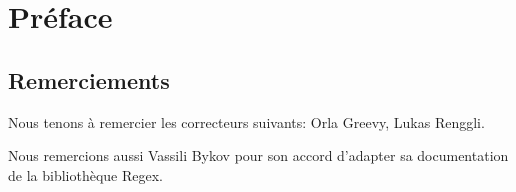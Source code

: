 \documentclass[a4paper,10pt,twoside]{book}
\begin{document}
	\sloppy
	\frontmatter
\fi
\chapter{Préface}



\section*{Remerciements}






Nous tenons à remercier les correcteurs suivants: 
Orla Greevy,
Lukas Renggli.

Nous remercions aussi 
Vassili Bykov 
pour son accord d'adapter sa documentation de la bibliothèque Regex.

\ifx\wholebook\relax\else
   
   
\end{document}
